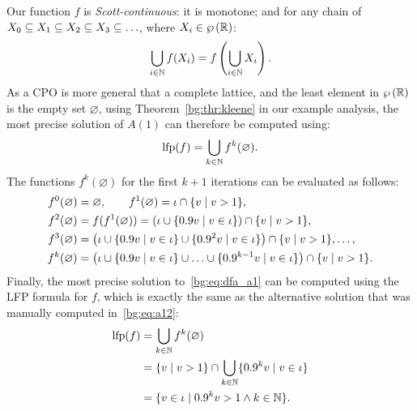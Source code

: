 Our function $f$ is \emph{Scott-continuous}: it is monotone; and for any chain
of $X_0 \subseteq X_1 \subseteq X_2 \subseteq X_3 \subseteq \mathellipsis$,
where $X_i \in \wp\left({\mathbb{R}}\right)$:
\begin{equation}
    \bigcup_{i \in \mathbb{N}} f(X_i) = f \left(
        \bigcup_{i \in \mathbb{N}} X_i
    \right).
\end{equation}
As a CPO is more general that a complete lattice, and the least
element in $\wp\left({\mathbb{R}}\right)$ is the empty set $\varnothing$, using
Theorem~\ref{bg:thr:kleene} in our example analysis, the most precise solution
of $A(1)$ can therefore be computed using:
\begin{equation}
    \operatorname{\mathrm{lfp}} (f) = \bigcup_{k \in \mathbb{N}} f^k (\varnothing).
\end{equation}
The functions $f^k(\varnothing)$ for the first $k+1$ iterations can be
evaluated as follows:
\begin{equation}
    \begin{aligned}
        f^0(\varnothing) &= \varnothing, \quad\quad
        f^1(\varnothing) = \iota \cap \{ v \mid v > 1 \}, \\
        f^2(\varnothing) &= f(f^1(\varnothing))
               = \left(
                     \iota \cup
                     \{ 0.9v \mid v \in \iota \}
                 \right) \cap \{ v \mid v > 1 \}, \\
        f^3(\varnothing) &= \left(
                     \iota \cup
                     \{ 0.9v \mid v \in \iota \} \cup
                     \{ 0.9^2 v \mid v \in \iota \}
                 \right) \cap \{ v \mid v > 1 \}, \mathellipsis, \\
        f^k(\varnothing) &= \left(
                     \iota \cup
                     \{ 0.9v \mid v \in \iota \} \cup
                     \mathellipsis \cup
                     \{ 0.9^{k-1} v \mid v \in \iota \}
                 \right) \cap \{ v \mid v > 1 \}.
    \end{aligned}
\end{equation}
Finally, the most precise solution to~\eqref{bg:eq:dfa_a1} can be computed
using the LFP formula for $f$, which is exactly the same as the alternative
solution that was manually computed in~\eqref{bg:eq:a12}:
\begin{equation}
    \begin{aligned}
        \operatorname{\mathrm{lfp}} (f)
            &= \bigcup_{k \in \mathbb{N}} f^k (\varnothing) \\
            &= \{ v \mid v > 1 \} \cap
               \bigcup_{k \in \mathbb{N}} \{ 0.9^k v \mid v \in \iota \} \\
            &= \{ v \in \iota \mid 0.9^k v > 1 \wedge k \in \mathbb{N} \}.
    \end{aligned}
\end{equation}


